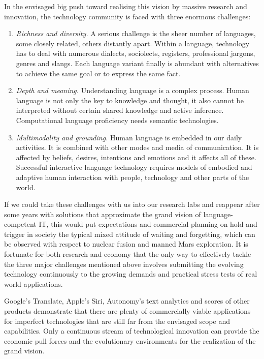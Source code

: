 \documentclass[10pt, plain]{../../metanetpaper}
\begin{document}
\begin{multicols}{2}
In the envisaged big push toward realising this vision by massive research and innovation, the technology community is faced with three enormous challenges:

\begin{enumerate}
\item \emph{Richness and diversity.} A serious challenge is the sheer number of languages, some closely related, others distantly apart. Within a language, technology has to deal with numerous dialects, sociolects, registers, professional jargons, genres and slangs. Each language variant finally is abundant with alternatives to achieve the same goal or to express the same fact.
\item \emph{Depth and meaning.} Understanding language is a complex process. Human language is not only the key to knowledge and thought, it also cannot be interpreted without certain shared knowledge and active inference. Computational language proficiency needs semantic technologies.
\item \emph{Multimodality and grounding.} Human language is embedded in our daily activities. It is combined with other modes and media of communication. It is affected by beliefs, desires, intentions and emotions and it affects all of these. Successful interactive language technology requires models of embodied and adaptive human interaction with people, technology and other parts of the world.
\end{enumerate}
 
If we could take these challenges with us into our research labs and reappear after some years with solutions that approximate the grand vision of language-competent IT, this would put expectations and commercial planning on hold and trigger in society the typical mixed attitude of waiting and forgetting, which can be observed with respect to nuclear fusion and manned Mars exploration. It is fortunate for both research and economy that the only way to effectively tackle the three major challenges mentioned above involves submitting the evolving technology continuously to the growing demands and practical stress tests of real world applications.

Google's Translate, Apple's Siri, Autonomy's text analytics and scores of other products demonstrate that there are plenty of commercially viable applications for imperfect technologies that are still far from the envisaged scope and capabilities. Only a continuous stream of technological innovation can provide the economic pull forces and the evolutionary environments for the realization of the grand vision. 


\end{multicols}
\end{document}
